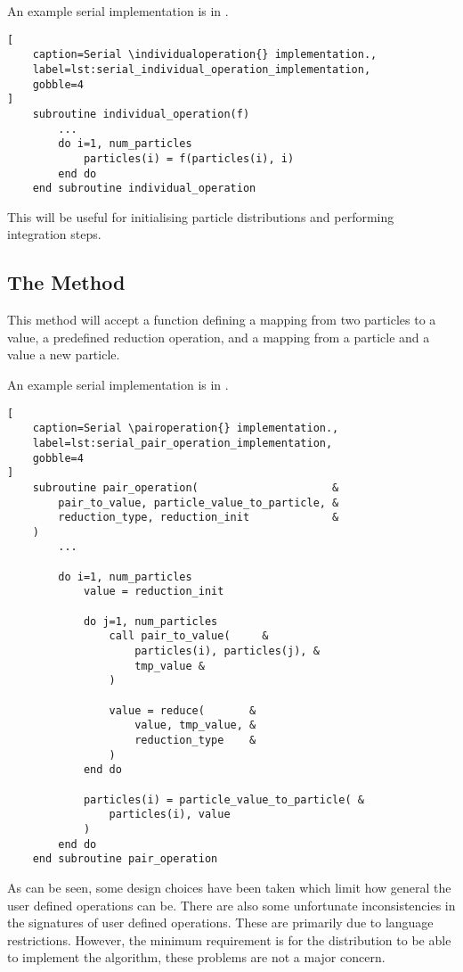 An example serial implementation is in
.

\begin{lstlisting}[
    caption=Serial \individualoperation{} implementation.,
    label=lst:serial_individual_operation_implementation,
    gobble=4
]
    subroutine individual_operation(f)
        ...
        do i=1, num_particles
            particles(i) = f(particles(i), i)
        end do
    end subroutine individual_operation
\end{lstlisting}

This will be useful for initialising particle distributions
and performing integration steps.


\subsection{The \pairoperation{} Method}
\label{sec:the_pair_operation_method}

This method will accept a function defining a mapping from two
particles to a value, a predefined reduction operation, and
a mapping from a particle and a value a new particle.

An example serial implementation is in
.

\begin{lstlisting}[
    caption=Serial \pairoperation{} implementation.,
    label=lst:serial_pair_operation_implementation,
    gobble=4
]
    subroutine pair_operation(                     &
        pair_to_value, particle_value_to_particle, &
        reduction_type, reduction_init             &
    )
        ...

        do i=1, num_particles
            value = reduction_init

            do j=1, num_particles
                call pair_to_value(     &
                    particles(i), particles(j), &
                    tmp_value &
                )

                value = reduce(       &
                    value, tmp_value, &
                    reduction_type    & 
                )
            end do

            particles(i) = particle_value_to_particle( &
                particles(i), value
            )
        end do
    end subroutine pair_operation
\end{lstlisting}

As can be seen, some design choices have been taken which limit how
general the user defined operations can be.
%
There are also some unfortunate inconsistencies in the signatures of
user defined operations.
%
These are primarily due to language restrictions.
%
However, the minimum requirement is for the distribution to be able
to implement the \velocityverlet{} algorithm,
these problems are not a major concern.


